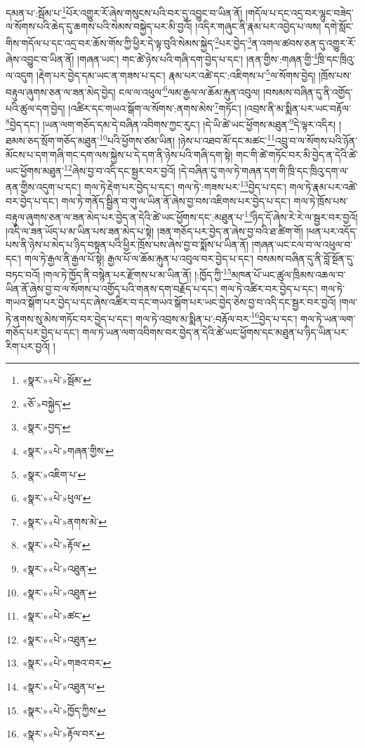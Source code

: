 དམན་པ་:སྦོམ་པ་\footnote{«སྣར་»«པེ་»སྦོམ་}པོར་འགྱུར་རོ་ཞེས་གསུངས་པའི་བར་དུ་འབྱུང་བ་ཡིན་ནོ། །གདོལ་པ་དང་འདྲ་བར་ལྷུང་བཟེད་ལ་སོགས་པའི་ཆེད་དུ་ཆགས་པའི་སེམས་བསྐྱེད་པར་མི་བྱའོ། །འདིར་གཞུང་ནི་རྣམ་པར་འབྱེད་པ་ལས། དགེ་སློང་གིས་གདོལ་པ་དང་འདྲ་བར་ཆོས་གོས་ཀྱི་ཕྱིར་དེ་ལྟ་བུའི་སེམས་སྐྱེད་\footnote{«ཅོ་»བསྐྱེད་}པར་བྱེད་\footnote{«སྣར་»བྱད་}ན་འགལ་ཚབས་ཅན་དུ་འགྱུར་རོ་ཞེས་འབྱུང་བ་ཡིན་ནོ། །གཞན་ཡང་། གང་ཚེ་ཉེས་པའི་གཞི་དག་བྱེད་པ་དང་། །ནན་གྱིས་:གཞན་གྱི་\footnote{«སྣར་»«པེ་»གཞན་གྱིས་}ཁྲི་དང་ཁྲིའུ་ལ་འདུག །རྡེག་པར་བྱེད་དམ་ཡང་ན་གཟས་པ་དང་། རྣམ་པར་འཚེ་དང་:འཇིགས་པ་\footnote{«སྣར་»འཇིག་པ་}ལ་སོགས་བྱེད། །ཁྲོས་པས་བརྟུལ་ཞུགས་ཅན་ལ་ཟན་མེད་བྱེད། ངལ་ལ་འཕུལ་\footnote{«སྣར་»«པེ་»ཕུལ་}ལམ་རྒྱལ་ལ་ཆོམ་རྐུན་འབུལ། །བསམས་བཞིན་དུ་ནི་འགྱོད་པའི་ཚུལ་དག་བྱེད། །འཚིར་དང་གཡའ་སྒོག་ལ་སོགས་:ནགས་མེས་\footnote{«སྣར་»«པེ་»ནགས་མེ་}གཏོང་། །འབྲས་ནི་མ་སྨིན་པར་ཡང་བརྟོལ་\footnote{«སྣར་»«པེ་»རྟོལ་}བྱེད་དང་། །ཡན་ལག་གཅོད་དམ་དེ་བཞིན་འབིགས་ཀྱང་རུང་། །དེ་ཡི་ཚེ་ཡང་ཕྱོགས་མཐུན་\footnote{«སྣར་»«པེ་»འཐུན་}དེ་ལྟར་འདིར། །ཐམས་ཅད་སྲོག་གཅོད་མཐུན་\footnote{«སྣར་»«པེ་»འཐུན་}པའི་ཕྱོགས་ཙམ་ཡིན། །ཉེས་པ་འཐབ་མོ་དང་མཚང་\footnote{«སྣར་»«པེ་»ཚང་}འབྲུ་བ་ལ་སོགས་པའི་ཉོན་མོངས་པ་དག་གཞི་གང་དག་ལས་སྐྱེས་པ་དེ་དག་ནི་ཉེས་པའི་གཞི་དག་སྟེ། གང་གི་ཚེ་གཏོང་བར་མི་བྱེད་ན་དེའི་ཚེ་ཡང་ཕྱོགས་མཐུན་\footnote{«སྣར་»«པེ་»འཐུན་}ཞེས་བྱ་བ་འདི་དང་སྦྱར་བར་བྱའོ། །དེ་བཞིན་དུ་གལ་ཏེ་གཞན་དག་གི་ཁྲི་དང་ཁྲིའུ་དག་ལ་ནན་གྱིས་འདུག་པ་དང་། གལ་ཏེ་རྡེག་པར་བྱེད་པ་དང་། གལ་ཏེ་:གཟས་པར་\footnote{«སྣར་»«པེ་»གཟའ་བར་}བྱེད་པ་དང་། གལ་ཏེ་རྣམ་པར་འཚེ་བར་བྱེད་པ་དང་། གལ་ཏེ་གནོད་སྦྱིན་བ་གུ་ལ་ཡིན་ནོ་ཞེས་བྱ་བས་འཇིགས་པར་བྱེད་པ་དང་། གལ་ཏེ་ཁྲོས་པས་བརྟུལ་ཞུགས་ཅན་ལ་ཟན་མེད་པར་བྱེད་ན་དེའི་ཚེ་ཡང་ཕྱོགས་དང་:མཐུན་པ་\footnote{«སྣར་»«པེ་»འཐུན་པ་}ཉིད་དོ་ཞེས་རེ་རེ་ལ་སྦྱར་བར་བྱའོ། །འདི་ལ་ཟན་ཡོད་པ་མ་ཡིན་པས་ཟན་མེད་པ་སྟེ། །ཟན་གཅོད་པར་བྱེད་ན་ཞེས་བྱ་བའི་ཐ་ཚིག་གོ། །ཕན་པར་འདོད་པས་ནི་ཉེས་པ་མེད་པ་ཉིད་བསྟན་པའི་ཕྱིར་ཁྲོས་པས་ཞེས་བྱ་བ་སྨོས་པ་ཡིན་ནོ། །གཞན་ཡང་ངལ་བ་ལ་འཕུལ་བ་དང་། གལ་ཏེ་རྒྱལ་ནི་རྒྱལ་པོ་སྟེ། རྒྱལ་པོ་ལ་ཆོམ་རྐུན་པ་འབུལ་བར་བྱེད་པ་དང་། བསམས་བཞིན་དུ་ནི་བློ་སྔོན་དུ་བཏང་བའོ། །གལ་ཏེ་ཁྱོད་ནི་བསྙེན་པར་རྫོགས་པ་མ་ཡིན་ནོ། །:ཁྱོད་ཀྱི་\footnote{«སྣར་»«པེ་»ཁྱོད་ཀྱིས་}མཁན་པོ་ཡང་ཚུལ་ཁྲིམས་འཆལ་བ་ཡིན་ནོ་ཞེས་བྱ་བ་ལ་སོགས་པ་འགྱོད་པའི་གནས་དག་བརྗོད་པ་དང་། གལ་ཏེ་འཚིར་བར་བྱེད་པ་དང་། གལ་ཏེ་གཡའ་སྒོག་པར་བྱེད་པ་དང་ཞེས་འཚིར་བ་དང་གཡའ་སྒོག་པར་ཡང་བྱེད་ཅེས་བྱ་བ་འདི་དང་སྦྱར་བར་བྱའོ། །གལ་ཏེ་ནགས་སུ་མེས་གཏོང་བར་བྱེད་པ་དང་། གལ་ཏེ་འབྲས་མ་སྨིན་པ་:བརྟོལ་བར་\footnote{«སྣར་»«པེ་»རྟོལ་བར་}བྱེད་པ་དང་། གལ་ཏེ་ཡན་ལག་གཅོད་པར་བྱེད་པ་དང་། གལ་ཏེ་ཡན་ལག་འབིགས་བར་བྱེད་ན་དེའི་ཚེ་ཡང་ཕྱོགས་དང་མཐུན་པ་ཉིད་ཡིན་པར་རིག་པར་བྱའོ། །
